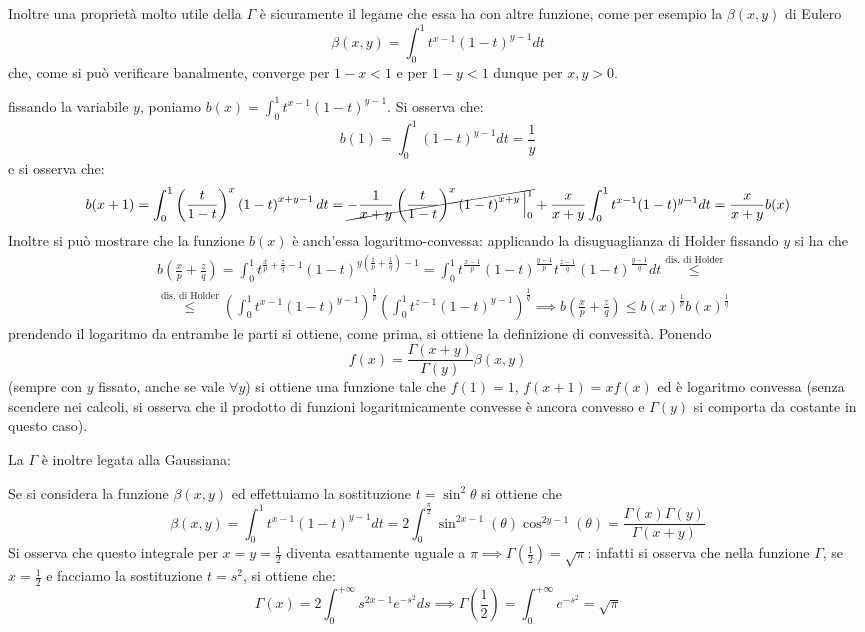\documentclass{report}
\begin{document}
\noindent Inoltre una proprietà molto utile della $\Gamma$ è sicuramente il legame che essa ha con altre funzione, come per esempio la $\beta (x, y)$ di Eulero
$$
	\beta(x, y) = \int_0^1 t^{x-1} (1-t)^{y-1}dt
$$
che, come si può verificare banalmente, converge per $1-x<1$ e per $1-y<1$ dunque per $x, y>0$.
\begin{myproof}
fissando la variabile $y$, poniamo $b(x) = \int_{0}^1 t^{x-1}(1-t)^{y-1}$. Si osserva che:
$$
b(1) = \int_{0}^{1} (1-t)^{y-1}dt = \frac{1}{y}
$$
e si osserva che:
$$
b(x+1) = \int_{0}^{1} \left( \frac{t}{1-t} \right)^x \left( 1-t \right)^{x+y-1} dt = \cancel{- \frac{1}{x+y} \left( \frac{t}{1-t} \right)^x \left( 1-t \right)^{x+y} \Big|_{0}^1} + \frac{x}{x+y} \int_{0}^{1} t^{x-1} (1-t)^{y-1}dt = \frac{x}{x+y} b(x)
$$
Inoltre si può mostrare che la funzione $b(x)$ è anch'essa logaritmo-convessa: applicando la disuguaglianza di Holder fissando $y$ si ha che
\begin{align*}
&b \left( \frac{x}{p} + \frac{z}{q} \right) = \int_{0}^1 t^{\frac{x}{p} + \frac{z}{q} - 1}(1-t)^{y(\frac{1}{p} + \frac{1}{q}) - 1} = \int_{0}^{1} t^\frac{x-1}{p} (1-t)^{\frac{y-1}{p}} t^{\frac{z-1}{q}}(1-t)^{\frac{y-1}{q}}dt \stackrel{\text{dis. di Holder}}{\leq} \\ &\stackrel{\text{dis. di Holder}}{\leq}  \left( \int_0^1 t^{x-1}(1-t)^{y-1} \right)^{\frac{1}{p}} \left( \int_{0}^1 t^{z-1}(1-t)^{y-1} \right)^{\frac{1}{q}} \implies b \left( \frac{x}{p} + \frac{z}{q} \right) \leq b(x)^{\frac{1}{p}} b(x)^{\frac{1}{q}}
\end{align*}
prendendo il logaritmo da entrambe le parti si ottiene, come prima, si ottiene la definizione di convessità. Ponendo
$$
f(x) = \frac{\Gamma(x+y)}{\Gamma(y)} \beta(x, y)
$$
\noindent (sempre con $y$ fissato, anche se vale $\forall y$) si ottiene una funzione tale che $f(1) = 1$, $f(x+1) = xf(x)$ ed è logaritmo convessa (senza scendere nei calcoli, si osserva che il prodotto di funzioni logaritmicamente convesse è ancora convesso e $\Gamma(y)$ si comporta da costante in questo caso).
\end{myproof}
\noindent La $\Gamma$ è inoltre legata alla Gaussiana:
\begin{myproof}
Se si considera la funzione $\beta(x, y)$ ed effettuiamo la sostituzione $t = \sin^2{\theta}$ si ottiene che
$$
\beta(x, y) = \int_0^1 t^{x-1} (1-t)^{y-1} dt = 2\int_{0}^{\frac{\pi}{2}} \sin^{2x-1}{(\theta)} \cos^{2y-1}{(\theta)}= \frac{\Gamma(x)\Gamma(y)}{\Gamma(x+y)}
$$
Si osserva che questo integrale per $x = y = \frac{1}{2}$ diventa esattamente uguale a $\pi \implies \Gamma(\frac{1}{2}) = \sqrt{\pi}$: infatti si osserva che nella funzione $\Gamma$, se $x=\frac{1}{2}$ e facciamo la sostituzione $t=s^2$, si ottiene che:
$$
\Gamma(x) = 2 \int_{0}^{+\infty} s^{2x-1} e^{-s^2} ds \implies \Gamma \left( \frac{1}{2} \right) = \int_{0}^{+\infty} e^{-s^2} = \sqrt{\pi}
$$
\end{myproof}
\end{document}
